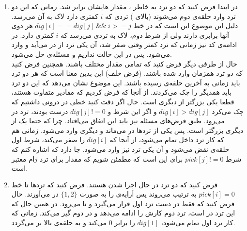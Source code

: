 \begin{enumerate}
    \item در ابتدا فرض کنید که دو ترد به خاطر
    ،
    مقدار
    هایشان
    برابر شد. زمانی که این دو ترد وارد حلقه‌ی
    دوم می‌شوند (بالای
    )
    تردی که
    $i$
    کمتری دارد لاک به آن می‌رسد. دلیل این موضوع این است که در خط
    $dig[i] == dig[j] ~ \&\& ~ i >= j$
    هر دوی آنها
    برابری دارند ولی از شرط دوم، لاک به تردی می‌رسد که
    $i$
    کمتری دارد. در ادامه‌ی کد نیز زمانی که
    ترد کمتر وقتی صفر شد، آن یکی ترد از
    در می‌آید و وارد
    می‌شود. پس در این حالت
    نداریم و مسئله‌ی
    حل می‌شود.
    \\
    حال از طرفی دیگر فرض کنید که تمامی مقدار
    مختلف باشند. همچنین فرض کنید که دو ترد همزمان وارد
    شده باشند. (فرض خلف)
    این بدین معنا است که هر دو ترد باید زمانی به آخرین حلقه‌ی
    رسیده باشند. این موضوع نشان می‌دهد که این دو ترد باید
    همدیگر را چک می‌کردند. از آنجا که فرض کردیم که مقادیر
    متفاوت هستند، قطعا یکی بزرگتر از دیگری است. حال اگر دقت کنید خطی در
    درونی داشتیم که چک می‌کرد
    $dig [i] > dig [j]$
    و اگر این شرط و
    $dig [j] != 0$
    درست بودند، ترد در
    می‌رود. طبق فرض‌های مسئله نیز باید این اتفاق می‌افتاد. چرا که حتما یک
    از دیگری بزرگتر است. پس یکی از ترد‌ها در
    می‌ماند و دیگری وارد
    می‌شود. زمانی هم که کار ترد داخل
    تمام می‌شود، از آنجا که
    $dig[i]$
    را صفر می‌کند، شرط اول حلقه‌ی
    نقض می‌شود و آن یکی ترد نیز وارد
    می‌شود. جا دارد که اشاره کنم که شرط
    $pick [j] != 0$
    برای این است که مطمئن شویم که مقدار
    برای ترد
    $j$ام
    معتبر است.
    \item فرض کنید که دو ترد در حال اجرا شدن هستند.
    فرض کنید که ترد‌ها تا خط
    $pick[i] = 0$
    به ترتیب می‌روند پس آرایه‌ی
    را به صورت
    $\{1, 2\}$
    در می‌آورند. حال فرض کنید که
    فقط در دست ترد اول قرار می‌گیرد و تا
    می‌رود. در همین حال که این ترد در
    است،  ترد دوم کارش را ادامه می‌دهد و در
    دوم گیر می‌کند.
    زمانی که کار ترد اول تمام می‌شود،
    $dig[1]$
    را برابر 0 می‌کند و به حلقه‌ی بالا بر می‌گردد.

\end{enumerate}
